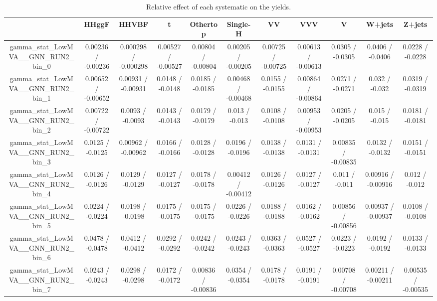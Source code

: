 \documentclass[10pt]{article}
\begin{document}
\begin{table}[htbp]
\begin{center}
\begin{tabular}{|c|c|c|c|c|c|c|c|c|c|c|}
\hline 
      & HHggF      & HHVBF      & t      & Othertop      & Single-H      & VV      & VVV      & V      & W+jets      & Z+jets \\ 
\hline 
  gamma_stat_LowMVA__GNN_RUN2_bin_0 & 0.00236 / -0.00236 & 0.000298 / -0.000298 & 0.00527 / -0.00527 & 0.00804 / -0.00804 & 0.00205 / -0.00205 & 0.00725 / -0.00725 & 0.00613 / -0.00613 & 0.0305 / -0.0305 & 0.0406 / -0.0406 & 0.0228 / -0.0228 \\ 
  gamma_stat_LowMVA__GNN_RUN2_bin_1 & 0.00652 / -0.00652 & 0.00931 / -0.00931 & 0.0148 / -0.0148 & 0.0185 / -0.0185 & 0.00468 / -0.00468 & 0.0155 / -0.0155 & 0.00864 / -0.00864 & 0.0271 / -0.0271 & 0.032 / -0.032 & 0.0319 / -0.0319 \\ 
  gamma_stat_LowMVA__GNN_RUN2_bin_2 & 0.00722 / -0.00722 & 0.0093 / -0.0093 & 0.0143 / -0.0143 & 0.0179 / -0.0179 & 0.013 / -0.013 & 0.0108 / -0.0108 & 0.00953 / -0.00953 & 0.0205 / -0.0205 & 0.015 / -0.015 & 0.0181 / -0.0181 \\ 
  gamma_stat_LowMVA__GNN_RUN2_bin_3 & 0.0125 / -0.0125 & 0.00962 / -0.00962 & 0.0166 / -0.0166 & 0.0128 / -0.0128 & 0.0196 / -0.0196 & 0.0138 / -0.0138 & 0.0131 / -0.0131 & 0.00835 / -0.00835 & 0.0132 / -0.0132 & 0.0151 / -0.0151 \\ 
  gamma_stat_LowMVA__GNN_RUN2_bin_4 & 0.0126 / -0.0126 & 0.0129 / -0.0129 & 0.0127 / -0.0127 & 0.0178 / -0.0178 & 0.00412 / -0.00412 & 0.0126 / -0.0126 & 0.0127 / -0.0127 & 0.011 / -0.011 & 0.00916 / -0.00916 & 0.012 / -0.012 \\ 
  gamma_stat_LowMVA__GNN_RUN2_bin_5 & 0.0224 / -0.0224 & 0.0198 / -0.0198 & 0.0175 / -0.0175 & 0.0175 / -0.0175 & 0.0226 / -0.0226 & 0.0188 / -0.0188 & 0.0162 / -0.0162 & 0.00856 / -0.00856 & 0.00937 / -0.00937 & 0.0108 / -0.0108 \\ 
  gamma_stat_LowMVA__GNN_RUN2_bin_6 & 0.0478 / -0.0478 & 0.0412 / -0.0412 & 0.0292 / -0.0292 & 0.0242 / -0.0242 & 0.0243 / -0.0243 & 0.0363 / -0.0363 & 0.0527 / -0.0527 & 0.0223 / -0.0223 & 0.0192 / -0.0192 & 0.0133 / -0.0133 \\ 
  gamma_stat_LowMVA__GNN_RUN2_bin_7 & 0.0243 / -0.0243 & 0.0298 / -0.0298 & 0.0172 / -0.0172 & 0.00836 / -0.00836 & 0.0354 / -0.0354 & 0.0178 / -0.0178 & 0.0191 / -0.0191 & 0.00708 / -0.00708 & 0.00211 / -0.00211 & 0.00535 / -0.00535 \\ 
\hline 
\end{tabular} 
\caption{Relative effect of each systematic on the yields.} 
\end{center} 
\end{table} 
\end{document}
